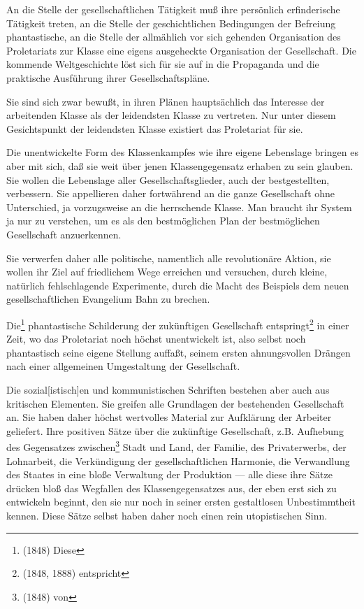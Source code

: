 \documentclass[letterpaper]{article}
\begin{document}
An die Stelle der gesellschaftlichen Tätigkeit muß ihre persönlich erfinderische Tätigkeit treten, an die Stelle der geschichtlichen Bedingungen der Befreiung phantastische, an die Stelle der allmählich vor sich gehenden Organisation des Proletariats zur Klasse eine eigens ausgeheckte Organisation der Gesellschaft. Die kommende Weltgeschichte löst sich für sie auf in die Propaganda und die praktische Ausführung ihrer Gesellschaftspläne.

Sie sind sich zwar bewußt, in ihren Plänen hauptsächlich das Interesse der arbeitenden Klasse als der leidendsten Klasse zu vertreten. Nur unter diesem Gesichtspunkt der leidendsten Klasse existiert das Proletariat für sie.

Die unentwickelte Form des Klassenkampfes wie ihre eigene Lebenslage bringen es aber mit sich, daß sie weit über jenen Klassengegensatz erhaben zu sein glauben. Sie wollen die Lebenslage aller Gesellschaftsglieder, auch der bestgestellten, verbessern. Sie appellieren daher fortwährend an die ganze Gesellschaft ohne Unterschied, ja vorzugsweise an die herrschende Klasse. Man braucht ihr System ja nur zu verstehen, um es als den bestmöglichen Plan der bestmöglichen Gesellschaft anzuerkennen.

Sie verwerfen daher alle politische, namentlich alle revolutionäre Aktion, sie wollen ihr Ziel auf friedlichem Wege erreichen und versuchen, durch kleine, natürlich fehlschlagende Experimente, durch die Macht des Beispiels dem neuen gesellschaftlichen Evangelium Bahn zu brechen.

Die\footnote{(1848) Diese} phantastische Schilderung der zukünftigen Gesellschaft entspringt\footnote{(1848, 1888) entspricht} in einer Zeit, wo das Proletariat noch höchst unentwickelt ist, also selbst noch phantastisch seine eigene Stellung auffaßt, seinem ersten ahnungsvollen Drängen nach einer allgemeinen Umgestaltung der Gesellschaft.

Die sozial[istisch]en und kommunistischen Schriften bestehen aber auch aus kritischen Elementen. Sie greifen alle Grundlagen der bestehenden Gesellschaft an. Sie haben daher höchst wertvolles Material zur Aufklärung der Arbeiter geliefert. Ihre positiven Sätze über die zukünftige Gesellschaft, z.B. Aufhebung des Gegensatzes zwischen\footnote{(1848) von} Stadt und Land, der Familie, des Privaterwerbs, der Lohnarbeit, die Verkündigung der gesellschaftlichen Harmonie, die Verwandlung des Staates in eine bloße Verwaltung der Produktion — alle diese ihre Sätze drücken bloß das Wegfallen des Klassengegensatzes aus, der eben erst sich zu entwickeln beginnt, den sie nur noch in seiner ersten gestaltlosen Unbestimmtheit kennen. Diese Sätze selbst haben daher noch einen rein utopistischen Sinn.
\end{document}
